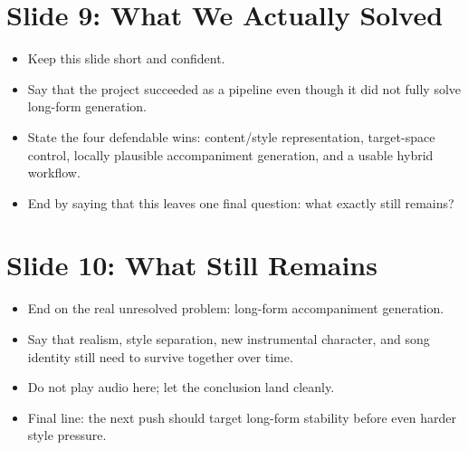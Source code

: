 \documentclass[11pt]{article}
\begin{document}
\section*{Slide 9: What We Actually Solved}
\begin{itemize}
\item Keep this slide short and confident.
\item Say that the project succeeded as a pipeline even though it did not fully solve long-form generation.
\item State the four defendable wins: content/style representation, target-space control, locally plausible accompaniment generation, and a usable hybrid workflow.
\item End by saying that this leaves one final question: what exactly still remains?
\end{itemize}

\section*{Slide 10: What Still Remains}
\begin{itemize}
\item End on the real unresolved problem: long-form accompaniment generation.
\item Say that realism, style separation, new instrumental character, and song identity still need to survive together over time.
\item Do not play audio here; let the conclusion land cleanly.
\item Final line: the next push should target long-form stability before even harder style pressure.
\end{itemize}
\end{document}
